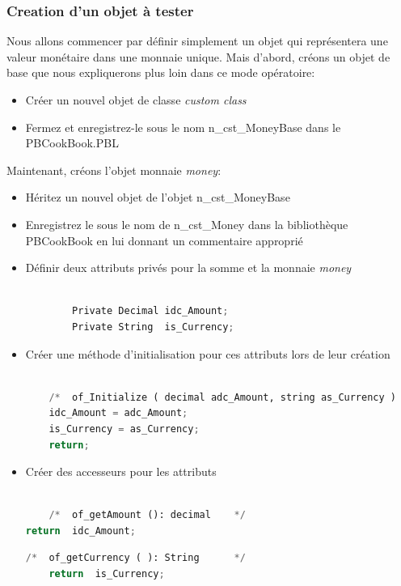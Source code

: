 \documentclass[a4paper,11pt,french]{refart}
\theoremstyle{definition}
\begin{document}
\subsubsection{Creation d'un objet à tester}
Nous allons commencer par définir simplement un objet  qui représentera une valeur monétaire dans une monnaie unique. 
Mais d'abord, créons un objet de base que nous expliquerons plus loin dans ce mode opératoire:
\begin{itemize}
    \item Créer un nouvel objet de classe \textit{custom class}
    \item Fermez et enregistrez-le sous le nom n\_cst\_MoneyBase dans le PBCookBook.PBL
\end{itemize}
Maintenant, créons l'objet monnaie \textit{money}:
\begin{itemize}
   \item Héritez un nouvel objet de l'objet n\_cst\_MoneyBase
    \item Enregistrez le sous le nom de n\_cst\_Money dans la bibliothèque PBCookBook en lui donnant un commentaire approprié
    \item  Définir deux attributs privés pour la somme et la monnaie \textit{money}

\begin{lstlisting}[language=Python, caption=variable d'instance de n\_cst\_money]
    
        Private Decimal	idc_Amount;
        Private String	is_Currency;

\end{lstlisting}
\item Créer une méthode d'initialisation pour ces attributs lors de leur création

\begin{lstlisting}[language=Python, caption=methode d'initialisation  de n\_cst\_money]
    
    /*	of_Initialize ( decimal adc_Amount, string as_Currency )	*/
    idc_Amount = adc_Amount;
    is_Currency = as_Currency;
    return;
\end{lstlisting}
\item  Créer des accesseurs pour les attributs
\begin{lstlisting}[language=Python, caption=accesseur pour recuperer la somme de l'objet \textit{money}]
    
    /*	of_getAmount (): decimal	*/
return	idc_Amount;

\end{lstlisting}
\begin{lstlisting}[language=Python, caption=accesseur pour recuperer la monnaie de l'objet \textit{money}]
    /*	of_getCurrency ( ): String		*/
    return	is_Currency;
    

\end{lstlisting}
\end{itemize}
\end{document}
